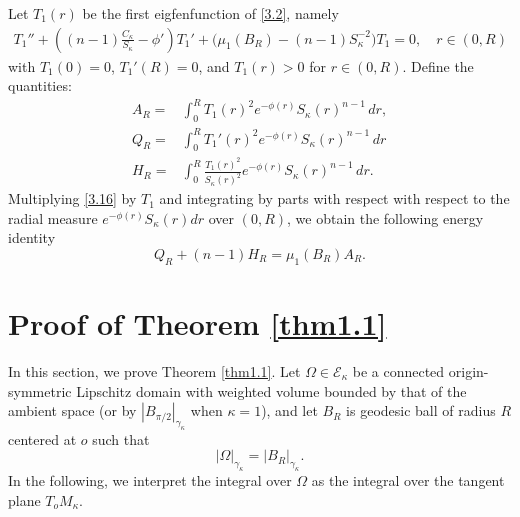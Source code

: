\documentclass[11pt,leqno]{amsart}
\def\k{\kappa}
\def\k{\kappa}
\numberwithin{equation}{section}
\begin{document}
Let $T_1(r)$ be the first eigfenfunction of  \eqref{3.2}, namely
\begin{align}\label{3.16}
T_1'' + \left((n-1)\frac{C_\kappa}{S_\kappa} - \phi'\right)T_1' + \big(\mu_1(B_R)- (n-1)S_\kappa^{-2}\big)T_1 = 0,\quad r\in (0, R)
\end{align}
with $T_1(0)=0$, $T_1'(R)=0$, and $T_1(r)>0$ for $r\in (0, R)$.
Define the quantities:
\begin{equation}\label{3.17}
\begin{aligned}
A_R=&\int_0^R T_{1}(r)^2e^{-\phi(r)}S_\k(r)^{n-1}\, dr,\\
Q_R=&\int_0^R T_{1}'(r)^2e^{-\phi(r)}S_\k(r)^{n-1}\, dr\\
H_R=&\int_0^R \frac{T_{1}(r)^2}{S_{\k}(r)^2}e^{-\phi(r)}S_\k(r)^{n-1}\, dr.
\end{aligned}
\end{equation}
Multiplying \eqref{3.16} by $T_1$ and integrating by parts with respect with respect to the radial measure $e^{-\phi(r)}S_\k(r)dr$ over $(0, R)$, we obtain the following energy identity
\begin{equation}\label{3.18}
Q_R+(n-1)H_R=\mu_{1}(B_R) A_R.
\end{equation}

\section{Proof of Theorem \ref{thm1.1}}\label{sect4}
In this section, we prove Theorem \ref{thm1.1}. Let $\Omega \in \mathcal{E}_\k$ be a connected origin-symmetric Lipschitz domain with weighted volume bounded by that of the ambient space (or by $|B_{\pi/2}|_{\gamma_\k}$ when $\k=1$), and let $B_R$ is geodesic ball of radius $R$ centered at $o$ such that
$$|\Omega|_{\gamma_\k}=|B_R|_{\gamma_\k}.$$
In the following, we interpret the integral over $\Omega$ as the integral over the tangent plane $T_oM_\k$. 
\end{document}
